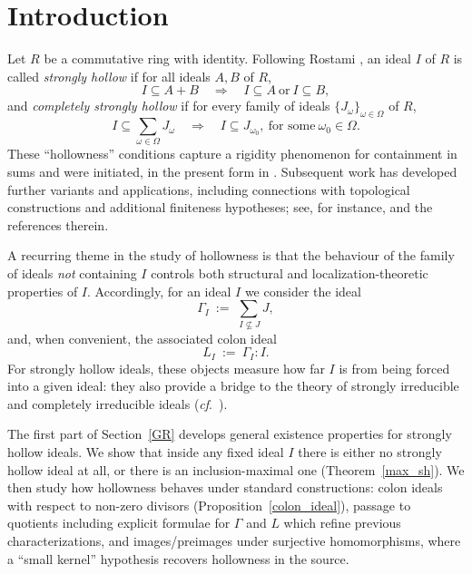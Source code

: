 \documentclass[11pt,english]{amsart}
\theoremstyle{definition}
\numberwithin{equation}{section}
\theoremstyle{remark}
\begin{document}
\section{Introduction}
Let $R$ be a commutative ring with identity. Following Rostami \cite{Rostami2021}, an ideal $I$ of $R$ is called
\emph{strongly hollow} if for all ideals $A,B$ of $R$,
\[
I\subseteq A+B \quad\Longrightarrow\quad I\subseteq A \ \text{or}\ I\subseteq B,
\]
and \emph{completely strongly hollow} if for every family of ideals $\{J_\omega\}_{\omega\in\Omega}$ of $R$,
\[
I\subseteq \sum_{\omega\in\Omega}J_\omega \quad\Longrightarrow\quad I\subseteq J_{\omega_0},
\ \text{for some}\ \omega_0\in\Omega.
\]
These “hollowness” conditions capture a rigidity phenomenon for containment in sums and were initiated, in the present form in \cite{Rostami2021}.
Subsequent work has developed further variants and applications, including connections with topological constructions and additional finiteness hypotheses; see, for instance,
\cite{Ceken-Yuksel} and the references therein.

A recurring theme in the study of hollowness is that the behaviour of the family of ideals \emph{not}
containing $I$ controls both structural and localization-theoretic properties of $I$.
Accordingly, for an ideal $I$ we consider the ideal
\[
\Gamma_I \ :=\ \sum_{\,I\not\subseteq J} J,
\]
and, when convenient, the associated colon ideal
\[
L_I \ :=\ \Gamma_I : I.
\]
For strongly hollow ideals, these objects measure how far $I$ is from being forced into a given ideal:
they also provide a bridge to the theory of strongly irreducible and completely irreducible ideals
(\textit{cf}.\ \cite{FHO,HRR2002}).

The first part of Section~\ref{GR} develops general existence properties for strongly hollow ideals.
We show that inside any fixed ideal $I$ there is either no strongly hollow ideal at all, or there is an inclusion-maximal one
(Theorem~\ref{max_sh}).
We then study how hollowness behaves under standard constructions: colon ideals with respect to non-zero divisors
(Proposition~\ref{colon_ideal}), passage to quotients including explicit formulae for $\Gamma$ and $L$ which refine previous characterizations,
and images/preimages under surjective homomorphisms, where a “small kernel” hypothesis recovers hollowness in the source.
\end{document}
